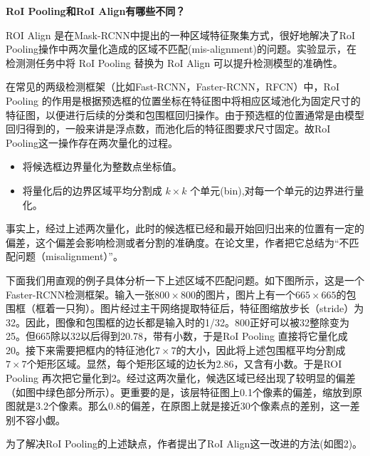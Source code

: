 \textbf{RoI Pooling和RoI Align有哪些不同？}

ROI Align 是在Mask-RCNN中提出的一种区域特征聚集方式，很好地解决了RoI
Pooling操作中两次量化造成的区域不匹配(mis-alignment)的问题。实验显示，在检测测任务中将
RoI Pooling 替换为 RoI Align 可以提升检测模型的准确性。

在常见的两级检测框架（比如Fast-RCNN，Faster-RCNN，RFCN）中，RoI Pooling
的作用是根据预选框的位置坐标在特征图中将相应区域池化为固定尺寸的特征图，以便进行后续的分类和包围框回归操作。由于预选框的位置通常是由模型回归得到的，一般来讲是浮点数，而池化后的特征图要求尺寸固定。故RoI
Pooling这一操作存在两次量化的过程。

\begin{itemize}
\item
  将候选框边界量化为整数点坐标值。
\item
  将量化后的边界区域平均分割成 \(k\times k\)
  个单元(bin),对每一个单元的边界进行量化。
\end{itemize}

事实上，经过上述两次量化，此时的候选框已经和最开始回归出来的位置有一定的偏差，这个偏差会影响检测或者分割的准确度。在论文里，作者把它总结为``不匹配问题（misalignment）''。

下面我们用直观的例子具体分析一下上述区域不匹配问题。如下图所示，这是一个Faster-RCNN检测框架。输入一张\(800\times 800\)的图片，图片上有一个\(665\times 665\)的包围框（框着一只狗）。图片经过主干网络提取特征后，特征图缩放步长（stride）为32。因此，图像和包围框的边长都是输入时的1/32。800正好可以被32整除变为25。但665除以32以后得到20.78，带有小数，于是RoI
Pooling
直接将它量化成20。接下来需要把框内的特征池化\(7\times 7\)的大小，因此将上述包围框平均分割成\(7\times 7\)个矩形区域。显然，每个矩形区域的边长为2.86，又含有小数。于是ROI
Pooling
再次把它量化到2。经过这两次量化，候选区域已经出现了较明显的偏差（如图中绿色部分所示）。更重要的是，该层特征图上0.1个像素的偏差，缩放到原图就是3.2个像素。那么0.8的偏差，在原图上就是接近30个像素点的差别，这一差别不容小觑。

\begin{figure}
\centering
\caption{}
\end{figure}

为了解决RoI Pooling的上述缺点，作者提出了RoI
Align这一改进的方法(如图2)。

\begin{figure}
\centering
\caption{}
\end{figure}

